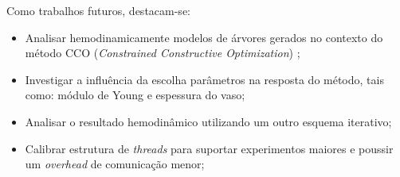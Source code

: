 
Como trabalhos futuros, destacam-se:
\begin{itemize}
	\item Analisar hemodinamicamente modelos de árvores gerados no contexto do método CCO (\emph{Constrained Constructive Optimization}) \cite{Karch1999,Queiroz2013,Queiroz2015,Brito2017};
	\item Investigar a influência da escolha parâmetros na resposta do método, tais como: módulo de Young e espessura do vaso;
	\item Analisar o resultado hemodinâmico utilizando um outro esquema iterativo;
	\item Calibrar estrutura de \textit{threads} para suportar experimentos maiores e poussir um \textit{overhead} de comunicação menor;
\end{itemize}